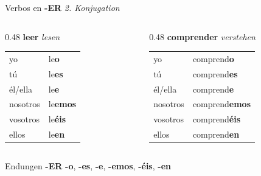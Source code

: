 \documentclass[aspectratio=169, 11pt]{beamer}
\newcommand{\seriftext}[1]{{\fontfamily{ppl}\selectfont #1}}
\newcommand{\es}[1]{\seriftext{\textbf{#1}}}
\newcommand{\de}[1]{\textit{\textcolor{mittelgrau}{#1}}}
\newcommand{\ender}[1]{\textcolor{endungER}{\textbf{#1}}}
\begin{document}
\begin{frame}{Verbos en \ender{-ER} \de{2. Konjugation}}
    \vspace{0.3cm}

    \begin{columns}[T]
        \begin{column}{0.48\textwidth}
            {\large\es{leer} \de{lesen}}

            \vspace{0.4cm}

            \renewcommand{\arraystretch}{1.4}
            \begin{tabular}{ll}
                yo & le\ender{o} \\
                tú & le\ender{es} \\
                él/ella & le\ender{e} \\
                nosotros & le\ender{emos} \\
                vosotros & le\ender{éis} \\
                ellos & le\ender{en} \\
            \end{tabular}
        \end{column}

        \begin{column}{0.48\textwidth}
            {\large\es{comprender} \de{verstehen}}

            \vspace{0.4cm}

            \renewcommand{\arraystretch}{1.4}
            \begin{tabular}{ll}
                yo & comprend\ender{o} \\
                tú & comprend\ender{es} \\
                él/ella & comprend\ender{e} \\
                nosotros & comprend\ender{emos} \\
                vosotros & comprend\ender{éis} \\
                ellos & comprend\ender{en} \\
            \end{tabular}
        \end{column}
    \end{columns}

    \vspace{0.6cm}

    \begin{block}{Endungen \ender{-ER}}
        \ender{-o}, \ender{-es}, \ender{-e}, \ender{-emos}, \ender{-éis}, \ender{-en}
    \end{block}
\end{frame}
\end{document}
